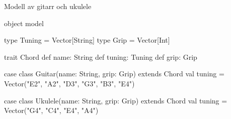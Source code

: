 \begin{Slide}{Modell av gitarr och ukulele}
\begin{Code}
object model {

  type Tuning = Vector[String]
  type Grip = Vector[Int]

  trait Chord {
    def name: String
    def tuning: Tuning
    def grip: Grip
  }
  
  case class Guitar(name: String, grip: Grip) extends Chord {
    val tuning = Vector("E2", "A2", "D3", "G3", "B3", "E4")
  }
  
  case class Ukulele(name: String, grip: Grip) extends Chord {
    val tuning = Vector("G4", "C4", "E4", "A4")
  }

}
\end{Code}
\end{Slide}

